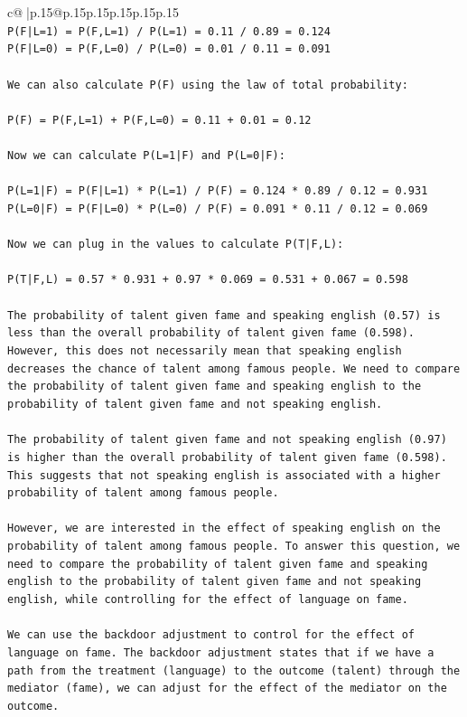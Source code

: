 \documentclass{article}
\begin{document}
{\begin{supertabular}{c@{$\;$}|p{.15\linewidth}@{}p{.15\linewidth}p{.15\linewidth}p{.15\linewidth}p{.15\linewidth}p{.15\linewidth}}
{{{\\ 
\texttt{P(F|L=1) = P(F,L=1) / P(L=1) = 0.11 / 0.89 = 0.124} \\
\texttt{P(F|L=0) = P(F,L=0) / P(L=0) = 0.01 / 0.11 = 0.091} \\
\\ 
\texttt{We can also calculate P(F) using the law of total probability:} \\
\\ 
\texttt{P(F) = P(F,L=1) + P(F,L=0) = 0.11 + 0.01 = 0.12} \\
\\ 
\texttt{Now we can calculate P(L=1|F) and P(L=0|F):} \\
\\ 
\texttt{P(L=1|F) = P(F|L=1) * P(L=1) / P(F) = 0.124 * 0.89 / 0.12 = 0.931} \\
\texttt{P(L=0|F) = P(F|L=0) * P(L=0) / P(F) = 0.091 * 0.11 / 0.12 = 0.069} \\
\\ 
\texttt{Now we can plug in the values to calculate P(T|F,L):} \\
\\ 
\texttt{P(T|F,L) = 0.57 * 0.931 + 0.97 * 0.069 = 0.531 + 0.067 = 0.598} \\
\\ 
\texttt{The probability of talent given fame and speaking english (0.57) is less than the overall probability of talent given fame (0.598). However, this does not necessarily mean that speaking english decreases the chance of talent among famous people. We need to compare the probability of talent given fame and speaking english to the probability of talent given fame and not speaking english.} \\
\\ 
\texttt{The probability of talent given fame and not speaking english (0.97) is higher than the overall probability of talent given fame (0.598). This suggests that not speaking english is associated with a higher probability of talent among famous people.} \\
\\ 
\texttt{However, we are interested in the effect of speaking english on the probability of talent among famous people. To answer this question, we need to compare the probability of talent given fame and speaking english to the probability of talent given fame and not speaking english, while controlling for the effect of language on fame.} \\
\\ 
\texttt{We can use the backdoor adjustment to control for the effect of language on fame. The backdoor adjustment states that if we have a path from the treatment (language) to the outcome (talent) through the mediator (fame), we can adjust for the effect of the mediator on the outcome.} \\
}}}
\end{supertabular}}
\end{document}
